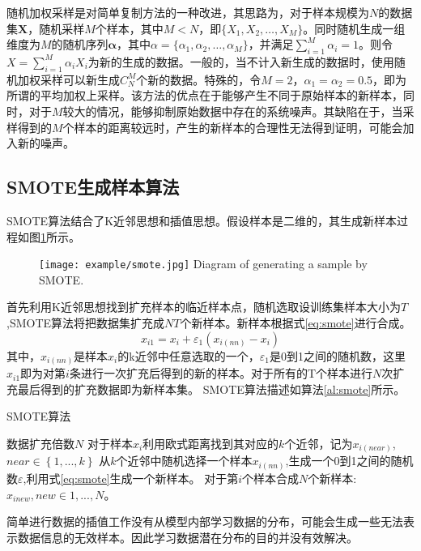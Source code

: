 随机加权采样是对简单复制方法的一种改进，其思路为，对于样本规模为$N$的数据集$\bm{X}$，随机采样$M$个样本，其中$M<N$，即$\{X_1,X_2,\ldots,X_M\}$。同时随机生成一组维度为$M$的随机序列$\bm{\alpha}$，其中$\alpha=\{\alpha_1,\alpha_2,\ldots,\alpha_M\}$，并满足$\sum_{i=1}^{M}\alpha_i=1$。则令$X=\sum_{i=1}^{M}\alpha_i X_i$为新的生成的数据。一般的，当不计入新生成的数据时，使用随机加权采样可以新生成$C_N^M$个新的数据。特殊的，令$M=2$，$\alpha_1=\alpha_2=0.5$，即为所谓的平均加权上采样。该方法的优点在于能够产生不同于原始样本的新样本，同时，对于$M$较大的情况，能够抑制原始数据中存在的系统噪声。其缺陷在于，当采样得到的$M$个样本的距离较远时，产生的新样本的合理性无法得到证明，可能会加入新的噪声。
\subsection{SMOTE生成样本算法}
SMOTE算法结合了K近邻思想和插值思想。假设样本是二维的，其生成新样本过程如图\ref{fig:smote}所示。
\begin{figure}[htbp]
	\centering
	\texttt{[image: example/smote.jpg]}
	{Diagram of generating a sample by SMOTE.}
	\label{fig:smote}
\end{figure}

首先利用K近邻思想找到扩充样本的临近样本点，随机选取设训练集样本大小为$T$,SMOTE算法将把数据集扩充成$NT$个新样本。新样本根据式\ref{eq:smote}进行合成。
\begin{equation}
	\label{eq:smote}
	{x_{i1}} = {x_i} + {\varepsilon _1}({x_{i(nn)}} - {x_i})
\end{equation}
其中，${x_{i(nn)}}$是样本$x_i$的k近邻中任意选取的一个，$\varepsilon _1$是0到1之间的随机数，这里$x_{i1}$即为对第$i$条进行一次扩充后得到的新的样本。对于所有的T个样本进行$N$次扩充最后得到的扩充数据即为新样本集。
SMOTE算法描述如算法\ref{al:smote}所示。

\begin{algorithm}[htbp]
	\caption{SMOTE算法}%
	\label{al:smote}
	\begin{algorithmic}[1]%
		\Require
		数据扩充倍数$N$
		\State 对于样本$x_i$利用欧式距离找到其对应的$k$个近邻，记为${x_{i(near)}}$,$near\in\left\{ {1,...,k} \right\} $
		\State
		从$k$个近邻中随机选择一个样本${x_{i(nn)}}$,生成一个0到1之间的随机数$\varepsilon$,利用式\ref{eq:smote}生成一个新样本。
		\EndFor
		\State 对于第$i$个样本合成$N$个新样本:${x_{inew}},new \in 1,...,N$。
		\EndFor
	\end{algorithmic}
\end{algorithm}
简单进行数据的插值工作没有从模型内部学习数据的分布，可能会生成一些无法表示数据信息的无效样本。因此学习数据潜在分布的目的并没有效解决。
